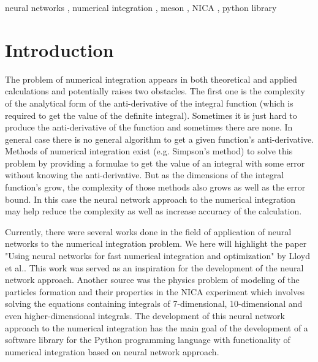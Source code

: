 \documentclass[%
]{ittmm}
\begin{document}
\begin{keywords}
  neural networks \sep
  numerical integration \sep
  meson \sep
  NICA \sep
  python library
\end{keywords}

\maketitle

\section{Introduction}

The problem of numerical integration appears in both theoretical and applied calculations and potentially raises two obstacles. The first one is the complexity of the analytical form of the anti-derivative of the integral function (which is required to get the value of the definite integral). Sometimes it is just hard to produce the anti-derivative of the function and sometimes there are none. In general case there is no general algorithm to get a given function's anti-derivative. Methods of numerical integration exist (e.g. Simpson's method) to solve this problem by providing a formulae to get the value of an integral with some error without knowing the anti-derivative. But as the dimensions of the integral function's grow, the complexity of those methods also grows as well as the error bound. In this case the neural network approach to the numerical integration may help reduce the complexity as well as increase accuracy of the calculation.

Currently, there were several works done in the field of application of neural networks to the numerical integration problem. We here will highlight the paper "Using neural networks for fast numerical integration and optimization" by Lloyd et al.\cite{lloyd2020using}. This work was served as an inspiration for the development of the neural network approach. Another source was the physics problem of modeling of the particles formation and their properties in the NICA experiment which involves solving the equations containing integrals of 7-dimensional, 10-dimensional and even higher-dimensional integrals. The development of this neural network approach to the numerical integration has the main goal of the development of a software library for the Python programming language with functionality of numerical integration based on neural network approach.
\end{document}
